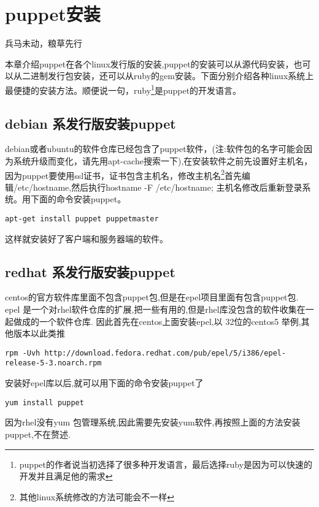 \chapter{\msyh puppet安装}
\begin{center}
\kai
兵马未动，粮草先行
\end{center}

\fzsk 本章介绍puppet在各个linux发行版的安装,puppet的安装可以从源代码安装，也可以从二进制发行包安装，还可以从ruby的gem安装。下面分别介绍各种linux系统上最便捷的安装方法。顺便说一句，ruby\footnote{\fsong\tiny puppet的作者说当初选择了很多种开发语言，最后选择ruby是因为可以快速的开发并且满足他的需求}是puppet的开发语言。
\song
\section{\msyh debian 系发行版安装puppet}
debian或者ubuntu的软件仓库已经包含了puppet软件，(注:软件包的名字可能会因为系统升级而变化，请先用apt-cache搜索一下),在安装软件之前先设置好主机名，因为puppet要使用ssl证书，证书包含主机名，修改主机名\footnote{\fsong\tiny 其他linux系统修改的方法可能会不一样}首先编辑/etc/hostname,然后执行hostname -F /etc/hostname; 主机名修改后重新登录系统。用下面的命令安装puppet。
\msyh
\begin{lstlisting}
apt-get install puppet puppetmaster
\end{lstlisting}
\fzsk
这样就安装好了客户端和服务器端的软件。

\section{\msyh redhat 系发行版安装puppet}

centos的官方软件库里面不包含puppet包,但是在epel项目里面有包含puppet包. epel 是一个对rhel软件仓库的扩展,把一些有用的,但是rhel库没包含的软件收集在一起做成的一个软件仓库.
因此首先在centos上面安装epel,以 32位的centos5 举例,其他版本以此类推
\msyh
\begin{lstlisting}
rpm -Uvh http://download.fedora.redhat.com/pub/epel/5/i386/epel-release-5-3.noarch.rpm
\end{lstlisting}
\song
安装好epel库以后,就可以用下面的命令安装puppet了
\msyh
\begin{lstlisting}
yum install puppet
\end{lstlisting}
\song
因为rhel没有yum 包管理系统,因此需要先安装yum软件,再按照上面的方法安装puppet,不在赘述.


